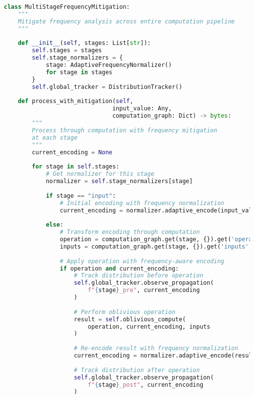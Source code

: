 \begin{lstlisting}[language=Python, caption={Multi-stage frequency mitigation}]
class MultiStageFrequencyMitigation:
    """
    Mitigate frequency analysis across entire computation pipeline
    """
    
    def __init__(self, stages: List[str]):
        self.stages = stages
        self.stage_normalizers = {
            stage: AdaptiveFrequencyNormalizer()
            for stage in stages
        }
        self.global_tracker = DistributionTracker()
        
    def process_with_mitigation(self,
                               input_value: Any,
                               computation_graph: Dict) -> bytes:
        """
        Process through computation with frequency mitigation
        at each stage
        """
        current_encoding = None
        
        for stage in self.stages:
            # Get normalizer for this stage
            normalizer = self.stage_normalizers[stage]
            
            if stage == "input":
                # Initial encoding with frequency normalization
                current_encoding = normalizer.adaptive_encode(input_value)
                
            else:
                # Transform encoding through computation
                operation = computation_graph.get(stage, {}).get('operation')
                inputs = computation_graph.get(stage, {}).get('inputs', [])
                
                # Apply operation with frequency-aware encoding
                if operation and current_encoding:
                    # Track distribution before operation
                    self.global_tracker.observe_propagation(
                        f"{stage}_pre", current_encoding
                    )
                    
                    # Perform oblivious operation
                    result = self.oblivious_compute(
                        operation, current_encoding, inputs
                    )
                    
                    # Re-encode result with frequency normalization
                    current_encoding = normalizer.adaptive_encode(result)
                    
                    # Track distribution after operation
                    self.global_tracker.observe_propagation(
                        f"{stage}_post", current_encoding
                    )
        

\end{lstlisting}
